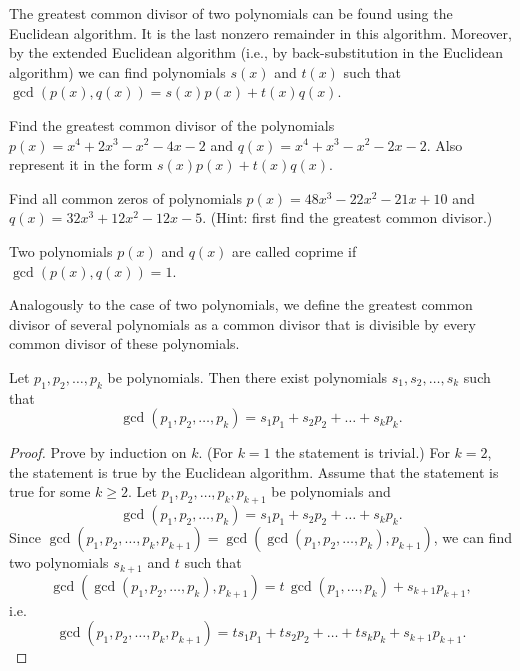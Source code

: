 The greatest common divisor of two polynomials can be found using the Euclidean algorithm. It is the last nonzero remainder in this algorithm. Moreover, by the extended Euclidean algorithm (i.e., by back-substitution in the Euclidean algorithm) we can find polynomials $s(x)$ and $t(x)$ such that $\gcd(p(x), q(x)) = s(x)p(x) + t(x)q(x)$.


\begin{exercise}
Find the greatest common divisor of the polynomials $p(x) = x^4 + 2x^3 - x^2 - 4x - 2$ and $q(x) = x^4 + x^3 - x^2 - 2x - 2$. Also represent it in the form $s(x)p(x) + t(x)q(x)$.
\end{exercise}

\begin{exercise}
Find all common zeros of polynomials $p(x) = 48x^3-22x^2 - 21 x + 10$ and $q(x) = 32x^3 + 12x^2 - 12x - 5$. (Hint: first find the greatest common divisor.)
\end{exercise}

\begin{definition}
Two polynomials $p(x)$ and $q(x)$ are called coprime if $\gcd(p(x), q(x)) = 1$.
\end{definition}

Analogously to the case of two polynomials, we define the greatest common divisor of several polynomials as a common divisor that is divisible by every common divisor of these polynomials.

\begin{lemma}
Let $p_1, p_2, \ldots, p_k$ be polynomials. Then there exist polynomials $s_1, s_2, \ldots, s_k$ such that 
$$\gcd(p_1, p_2, \ldots, p_k) = s_1 p_1 + s_2 p_2 + \ldots + s_k p_k.
$$
\end{lemma}

\begin{proof}
Prove by induction on $k$. (For $k = 1$ the statement is trivial.) For $k = 2$, the statement is true by the Euclidean algorithm. Assume that the statement is true for some $k\geqslant 2$. Let $p_1, p_2, \ldots, p_k, p_{k+1}$ be polynomials and 
$$\gcd(p_1, p_2, \ldots, p_k) = s_1 p_1 + s_2 p_2 + \ldots + s_k p_k.$$
Since $\gcd(p_1, p_2, \ldots, p_k, p_{k+1}) = \gcd(\gcd(p_1, p_2, \ldots, p_k), p_{k+1})$, we can find two polynomials $s_{k+1}$ and $t$ such that 
$$\gcd(\gcd(p_1, p_2, \ldots, p_k), p_{k+1}) =
t\,\gcd(p_1, \dots, p_k) + s_{k+1} p_{k+1},$$
i.e.
$$\gcd(p_1, p_2, \ldots, p_k, p_{k+1}) = t s_1 p_1 + t s_2 p_2 + \ldots + t s_k p_k + s_{k+1} p_{k+1}.$$
\end{proof}

